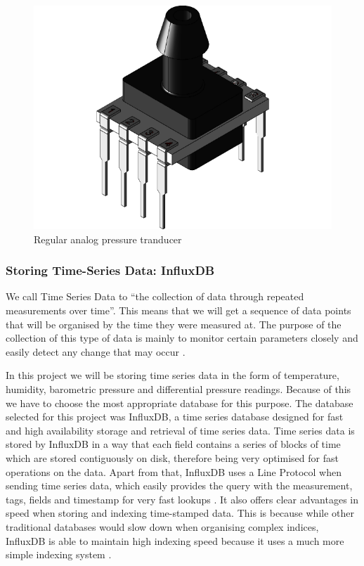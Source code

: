 \documentclass[12pt]{article}
\begin{document}
\begin{figure}[h]
\label{fig:010BGAA5}
\includegraphics[scale=0.15]{large}
\centering
\caption{Regular analog pressure tranducer}
\end{figure}

\subsubsection{Storing Time-Series Data: InfluxDB}

We call Time Series Data to ``the collection of data through repeated measurements over time''. This means that we will get a sequence of data points that will be organised by the time they were measured at. The purpose of the collection of this type of data is mainly to monitor certain parameters closely and easily detect any change that may occur \cite{influx:time-series}.\par

In this project we will be storing time series data in the form of temperature, humidity, barometric pressure and differential pressure readings. Because of this we have to choose the most appropriate database for this purpose. The database selected for this project was InfluxDB, a time series database designed for fast and high availability storage and retrieval of time series data. Time series data is stored by InfluxDB in a way that each field contains a series of blocks of time which are stored contiguously on disk, therefore being very optimised for fast operations on the data. Apart from that, InfluxDB uses a Line Protocol when sending time series data, which easily provides the query with the measurement, tags, fields and timestamp for very fast lookups \cite{influx:time-series}. It also offers clear advantages in speed when storing and indexing time-stamped data. This is because while other traditional databases would slow down when organising complex indices, InfluxDB is able to maintain high indexing speed because it uses a much more simple indexing system \cite{ionos}. \par
\end{document}
